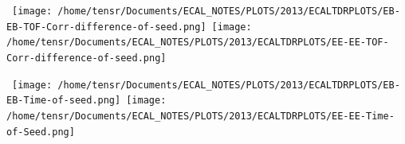  

\begin{center}
\centering
\mbox{
\texttt{[image: /home/tensr/Documents/ECAL\_NOTES/PLOTS/2013/ECALTDRPLOTS/EB-EB-TOF-Corr-difference-of-seed.png]}\quad
\texttt{[image: /home/tensr/Documents/ECAL\_NOTES/PLOTS/2013/ECALTDRPLOTS/EE-EE-TOF-Corr-difference-of-seed.png]}}
\label{fig:ZeeTimePerformance2}
\end{center}

\begin{center}
\centering
\mbox{
\texttt{[image: /home/tensr/Documents/ECAL\_NOTES/PLOTS/2013/ECALTDRPLOTS/EB-EB-Time-of-seed.png]}\quad
\texttt{[image: /home/tensr/Documents/ECAL\_NOTES/PLOTS/2013/ECALTDRPLOTS/EE-EE-Time-of-Seed.png]}}
\label{fig:ZeeTimePerformance1}
\end{center}


